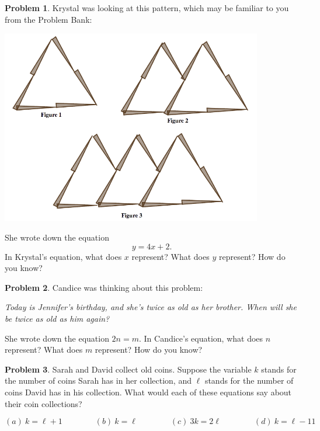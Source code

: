 \documentclass[12pt, reqno]{amsart}
\theoremstyle{remark}
\theoremstyle{definition}
\newtheorem{problem}{Problem}
\numberwithin{equation}{section}  %
\begin{document}
\begin{problem}\label{prob: krystal}
Krystal was looking at this pattern, which may be familiar to you from the Problem Bank:
\begin{center}
\includegraphics[height=8.5cm]{toothpicks4}
\end{center}
She wrote down the equation
\[
y = 4x + 2.
\]
In Krystal's equation, what does $x$ represent?  What does $y$ represent?  How do you know?


\end{problem}

\bigskip


\begin{problem}
Candice was thinking about this problem:
\begin{center}
\emph{Today is Jennifer's birthday, and she's twice as old as her brother.  When will she be twice as old as him again?}
\end{center}
She wrote down the equation $2 n = m$.  In Candice's equation, what does $n$ represent?  What does $m$ represent?  How do you know?

\end{problem}

\bigskip

\begin{problem}
Sarah and David collect old coins.  Suppose the variable $k$ stands for the number of coins Sarah has in her collection, and $\ell$ stands for the number of coins David has in his collection.  What would each of these equations say about their coin collections?

\[
(a)\  k = \ell + 1 
\qquad\qquad
(b)\  k = \ell 
\qquad\qquad
(c) \ 3k = 2\ell
\qquad\qquad
(d)\  k = \ell - 11
\]


\end{problem}
\end{document}
